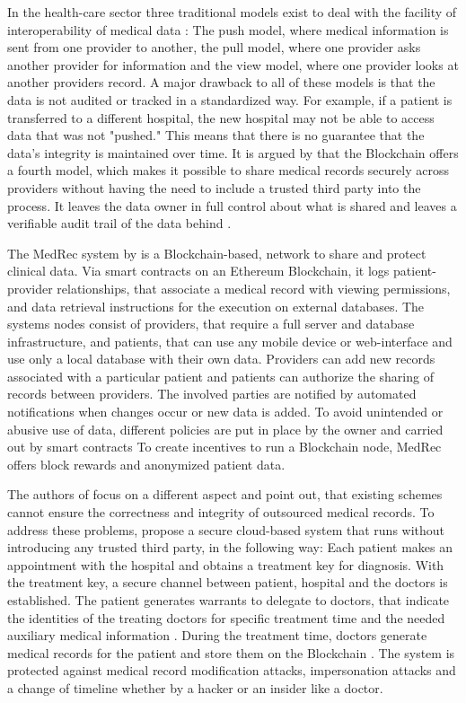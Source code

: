 In the health-care sector three traditional models exist to deal with the facility of interoperability of medical data \cite{Kshetri2017}: The push model, where medical information is sent from one provider to another, the pull model, where one provider asks another provider for information and the view model, where one provider looks at another providers record.
A major drawback to all of these models is that the data is not audited or tracked in a standardized way. For example, if a patient is transferred to a different hospital, the new hospital may not be able to access data that was not "pushed." This means that there is no guarantee that the data's integrity is maintained over time.
It is argued by \cite{Kshetri2017} that the Blockchain offers a fourth model, which makes it possible to share medical records securely across providers without having the need to include a trusted third party into the process. It leaves the data owner in full control about what is shared and leaves a verifiable audit trail of the data behind \cite{Kshetri2017}.

The MedRec system by \cite{Azaria2016} is a Blockchain-based, network to share and protect clinical data. Via smart contracts on an Ethereum Blockchain, it logs patient-provider relationships, that associate a medical record with viewing permissions, and data retrieval instructions for the execution on external databases.
The systems nodes consist of providers, that require a full server and database infrastructure, and patients, that can use any mobile device or web-interface and use only a local database with their own data.
Providers can add new records associated with a particular patient and patients can authorize the sharing of records between providers. The involved parties are notified by automated notifications when changes occur or new data is added. To avoid unintended or abusive use of data, different policies are put in place by the owner and carried out by smart contracts
To create incentives to run a Blockchain node, MedRec offers block rewards and anonymized patient data.

The authors of\cite{Cao2019} focus on a different aspect and point out, that existing schemes cannot ensure the correctness and integrity of outsourced medical records. 
To address these problems, \cite{Cao2019} propose a secure cloud-based system that runs without introducing any trusted third party, in the following way:
 Each patient makes an appointment with the hospital and obtains a treatment key for diagnosis. With the treatment key, a secure channel between patient, hospital and the doctors is established. 
The patient generates warrants to delegate to doctors, that indicate the identities of the treating doctors for specific treatment time and the needed auxiliary medical information \cite{Cao2019}.
During the treatment time, doctors generate medical records for the patient and store them on the Blockchain \cite{Cao2019}.
The system is protected against medical record modification attacks, impersonation attacks and a change of timeline whether by a hacker or an insider like a doctor.

